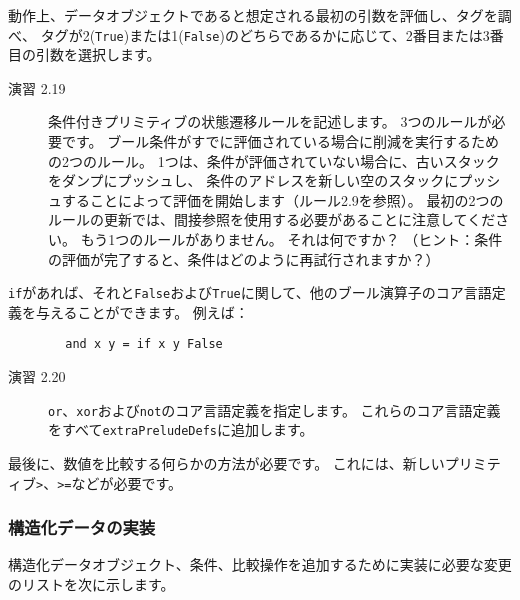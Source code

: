 \documentclass{jarticle}
\begin{document}
動作上、データオブジェクトであると想定される最初の引数を評価し、タグを調べ、
タグが2(\texttt{True})または1(\texttt{False})のどちらであるかに応じて、2番目または3番目の引数を選択します。

\begin{description}
	\item[演習 2.19] 条件付きプリミティブの状態遷移ルールを記述します。
		3つのルールが必要です。
		ブール条件がすでに評価されている場合に削減を実行するための2つのルール。
		1つは、条件が評価されていない場合に、古いスタックをダンプにプッシュし、
		条件のアドレスを新しい空のスタックにプッシュすることによって評価を開始します（ルール2.9を参照）。
		最初の2つのルールの更新では、間接参照を使用する必要があることに注意してください。
		もう1つのルールがありません。
		それは何ですか？
		（ヒント：条件の評価が完了すると、条件はどのように再試行されますか？）
\end{description}

\texttt{if}があれば、それと\texttt{False}および\texttt{True}に関して、他のブール演算子のコア言語定義を与えることができます。
例えば：

\begin{verbatim}
        and x y = if x y False
\end{verbatim}

\begin{description}
	\item[演習 2.20] \texttt{or}、\texttt{xor}および\texttt{not}のコア言語定義を指定します。
		これらのコア言語定義をすべて\texttt{extraPreludeDefs}に追加します。
\end{description}

最後に、数値を比較する何らかの方法が必要です。
これには、新しいプリミティブ\texttt{>}、\texttt{>=}などが必要です。

\subsubsection{構造化データの実装}

構造化データオブジェクト、条件、比較操作を追加するために実装に必要な変更のリストを次に示します。
\end{document}
